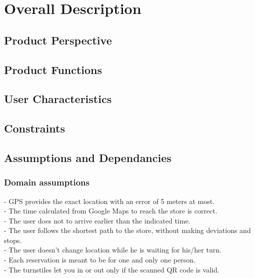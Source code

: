 \documentclass{article}
\begin{document}
\section{Overall Description}
\subsection{Product Perspective}
\subsection{Product Functions}
\subsection{User Characteristics}
\subsection{Constraints}
\subsection{Assumptions and Dependancies}
\subsubsection{Domain assumptions}
\noindent\medskip
[D1] - GPS provides the exact location with an error of 5 meters at most.\\
\noindent\medskip
[D2] - The time calculated from Google Maps to reach the store is correct.\\
\noindent\medskip
[D3] - The user does not to arrive earlier than the indicated time.\\
\noindent\medskip
[D4] - The user follows the shortest path to the store, without making deviations and stops.\\
\noindent\medskip
[D5] - The user doesn’t change location while he is waiting for his/her turn.\\
\noindent\medskip
[D6] - Each reservation is meant to be for one and only one person.\\
\noindent\medskip
[D7] - The turnstiles let you in or out only if the scanned QR code is valid.\\
\end{document}
